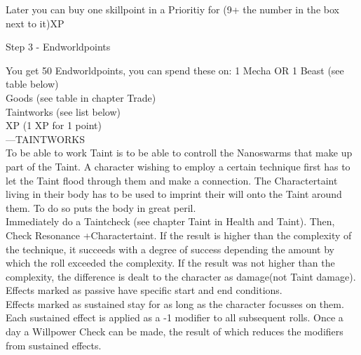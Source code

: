 \documentclass{article}
\newcommand{\subhline}[1]{\begin{center}\large #1 \normalsize \end{center}}
\begin{document}
Later you can buy one skillpoint in a Prioritiy for (9+ the number in the box next to it)XP\\


\subhline{Step 3 - Endworldpoints}
You get 50 Endworldpoints, you can spend these on:
 1 Mecha OR 1 Beast (see table below)\\
 Goods (see table in chapter Trade)\\
 Taintworks (see list below)\\
 XP (1 XP for 1 point)\\

---TAINTWORKS\\

To be able to work Taint is to be able to controll the Nanoswarms that make up part of the Taint. A character wishing to
employ a certain technique first has to let the Taint flood through them and make a connection. The Charactertaint living
in their body has to be used to imprint their will onto the Taint around them. To do so puts the body in great peril.\\

Immediately do a Taintcheck (see chapter Taint in Health and Taint). Then, Check Resonance +Charactertaint. If the
result is higher than the complexity of the technique, it succeeds with a degree of success
depending the amount by which the roll exceeded the complexity. If the result was not higher than the complexity,
the difference is dealt to the character as damage(not Taint damage).\\
Effects marked as passive have specific start and end conditions. \\
Effects marked as sustained stay for as long as the character focusses on them. Each sustained effect is applied as a -1
modifier to all subsequent rolls. Once a day a Willpower Check can be made, the result of which reduces the modifiers from sustained effects.\\
\end{document}
